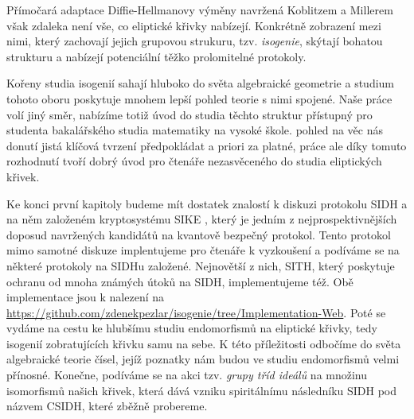 \documentclass[12pt]{report}
\begin{document}
Přímočará adaptace Diffie-Hellmanovy výměny navržená Koblitzem a Millerem však zdaleka není vše, co eliptické křivky nabízejí. Konkrétně zobrazení mezi nimi, který zachovají jejich grupovou strukuru, tzv. \textit{isogenie}, skýtají bohatou strukturu a nabízejí potenciální těžko prolomitelné protokoly.

Kořeny studia isogenií sahají hluboko do světa algebraické geometrie a studium tohoto oboru poskytuje mnohem lepší pohled  teorie s nimi spojené. Naše práce volí jiný směr, nabízíme totiž úvod do studia těchto struktur přístupný pro studenta bakalářského studia matematiky na vysoké škole.   pohled na věc nás donutí jistá klíčová tvrzení předpokládat a priori za platné, práce ale díky tomuto rozhodnutí tvoří dobrý úvod pro čtenáře nezasvěceného do studia eliptických křivek.

Ke konci první kapitoly budeme mít dostatek znalostí k diskuzi protokolu SIDH a na něm založeném kryptosystému SIKE \cite{DeFeo3}, který je jedním z nejprospektivnějších doposud navržených kandidátů na kvantově bezpečný protokol. Tento protokol mimo samotné diskuze implentujeme pro čtenáře k vyzkoušení a podíváme se na některé protokoly na SIDHu založené. Nejnovětší z nich, SITH, který poskytuje ochranu od mnoha známých útoků na SIDH, implementujeme též. Obě implementace jsou k nalezení na \url{https://github.com/zdenekpezlar/isogenie/tree/Implementation-Web}. Poté se vydáme na cestu ke hlubšímu studiu endomorfismů na eliptické křivky, tedy isogenií zobratujících křivku samu na sebe. K této příležitosti odbočíme do světa algebraické teorie čísel, jejíž poznatky nám budou ve studiu endomorfismů velmi přínosné. Konečne, podíváme se na akci tzv. \textit{grupy tříd ideálů} na množinu isomorfismů našich křivek, která dává vzniku spiritálnímu následníku SIDH pod názvem CSIDH, které zběžně probereme. 

 
\end{document}
